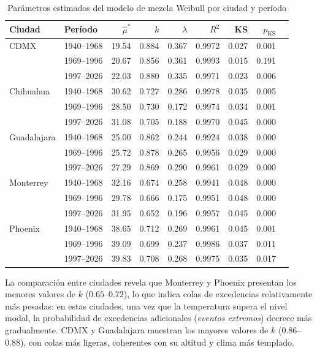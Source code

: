 \documentclass[APA,STIX1COL]{WileyNJD-v2}
\begin{document}
{\begin{table}[ht]
\centering
\normalem
\begin{tabular}{llrrrrrrr}
\toprule
Ciudad & Período & $\hat\mu^*$ & $k$ & $\lambda$ & $R^2$ & KS & $p_{\mathrm{KS}}$ \\
\midrule
CDMX        & 1940–1968 & 19.54 & 0.884 & 0.367 & 0.9972 & 0.027 & 0.001 \\
        & 1969–1996 & 20.67 & 0.856 & 0.361 & 0.9993 & 0.015 & 0.191 \\
        & 1997–2026 & 22.03 & 0.880 & 0.335 & 0.9971 & 0.023 & 0.006 \\
\midrule
Chihuahua   & 1940–1968 & 30.62 & 0.727 & 0.286 & 0.9978 & 0.035 & 0.005 \\
   & 1969–1996 & 28.50 & 0.730 & 0.172 & 0.9974 & 0.034 & 0.001 \\
   & 1997–2026 & 31.08 & 0.705 & 0.188 & 0.9970 & 0.045 & 0.000 \\
\midrule
Guadalajara & 1940–1968 & 25.00 & 0.862 & 0.244 & 0.9924 & 0.038 & 0.000 \\
 & 1969–1996 & 25.72 & 0.878 & 0.265 & 0.9956 & 0.029 & 0.000 \\
 & 1997–2026 & 27.29 & 0.869 & 0.290 & 0.9961 & 0.029 & 0.000 \\
\midrule
Monterrey   & 1940–1968 & 32.16 & 0.674 & 0.258 & 0.9941 & 0.048 & 0.000 \\
   & 1969–1996 & 29.78 & 0.666 & 0.175 & 0.9951 & 0.048 & 0.000 \\
   & 1997–2026 & 31.95 & 0.652 & 0.196 & 0.9957 & 0.045 & 0.000 \\
\midrule
Phoenix     & 1940–1968 & 38.65 & 0.712 & 0.269 & 0.9961 & 0.045 & 0.001 \\
     & 1969–1996 & 39.09 & 0.699 & 0.237 & 0.9986 & 0.037 & 0.011 \\
     & 1997–2026 & 39.83 & 0.708 & 0.268 & 0.9975 & 0.035 & 0.017 \\
\bottomrule
\end{tabular}
\caption{Parámetros estimados del modelo de mezcla Weibull por ciudad
y período}
\label{tab:parametros}
\end{table}

La comparación entre ciudades revela que Monterrey y Phoenix
presentan los menores valores de $k$ ($0.65$--$0.72$),
lo que indica colas de excedencias relativamente más pesadas:
en estas ciudades, una vez que la temperatura supera el nivel
modal, la probabilidad de excedencias adicionales (\textit{eventos extremos})
decrece más gradualmente. CDMX y Guadalajara muestran los
mayores valores de $k$ ($0.86$--$0.88$), con colas
más ligeras, coherentes con su altitud y clima más templado.

}
\end{document}
